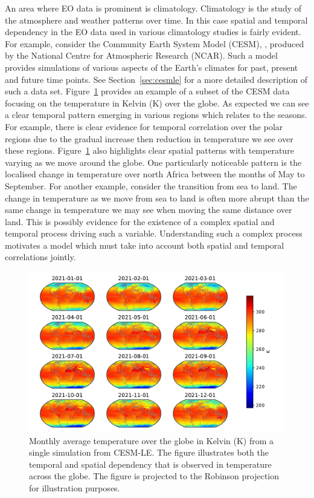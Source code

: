 An area where EO data is prominent is climatology.
Climatology is the study of the atmosphere and weather patterns over time.
In this case spatial and temporal dependency in the EO data used in various climatology studies is fairly evident.
For example, consider the Community Earth System Model (CESM), \citep{kay_community_2015}, produced by the National Centre for Atmospheric Research (NCAR).
Such a model provides simulations of various aspects of the Earth's climates for past, present and future time points.
See Section~\ref{sec:cesmle} for a more detailed description of such a data set.
Figure~\ref{fig:cesm_example} provides an example of a subset of the CESM data focusing on the temperature in Kelvin ($\si{\kelvin}$) over the globe.
As expected we can see a clear temporal pattern emerging in various regions which relates to the seasons.
For example, there is clear evidence for temporal correlation over the polar regions due to the gradual increase then reduction in temperature we see over these regions.
Figure~\ref{fig:cesm_example} also highlights clear spatial patterns with temperature varying as we move around the globe.
One particularly noticeable pattern is the localised change in temperature over north Africa between the months of May to September.
For another example, consider the transition from sea to land.
The change in temperature as we move from sea to land is often more abrupt than the same change in temperature we may see when moving the same distance over land. 
This is possibly evidence for the existence of a complex spatial and temporal process driving such a variable.
Understanding such a complex process motivates a model which must take into account both spatial and temporal correlations jointly. 



\begin{figure}[htbp!] 
	\centering    
	\includegraphics[width=1.0\textwidth]{cesm_temp_example}
	\caption[Average monthly temperature from CESM-LE]{Monthly average temperature over the globe in Kelvin ($\si{\kelvin}$) from a single simulation from CESM-LE. The figure illustrates both the temporal and spatial dependency that is observed in temperature across the globe. The figure is projected to the Robinson projection for illustration purposes.}
	\label{fig:cesm_example}
\end{figure}

